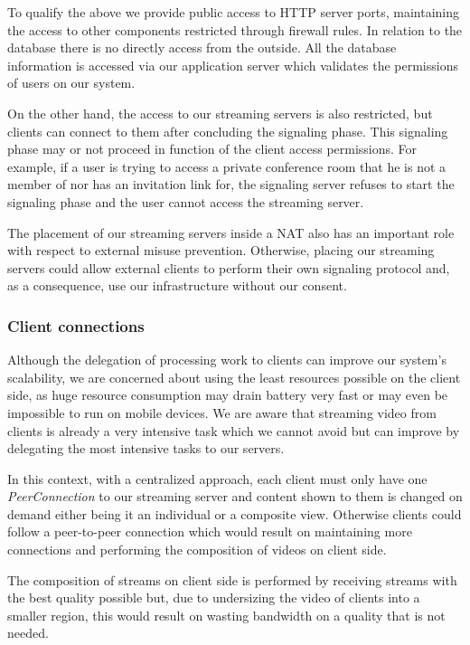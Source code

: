 \documentclass[conference,compsoc,a4paper]{IEEEtran}
\begin{document}
To qualify the above we provide public access to \gls{HTTP} server ports, maintaining the access to other components restricted through firewall rules.
In relation to the database there is no directly access from the outside. All the database information is accessed via our application server which validates the permissions of users on our system.

On the other hand, the access to our streaming servers is also restricted, but clients can connect to them after concluding the signaling phase. This signaling phase may or not proceed in function of the client access permissions. For example, if a user is trying to access a private conference room that he is not a member of nor has an invitation link for, the signaling server refuses to start the signaling phase and the user cannot access the streaming server.

The placement of our streaming servers inside a \gls{NAT} also has an important role with respect to external misuse prevention. Otherwise, placing our streaming servers could allow external clients to perform their own signaling protocol and, as a consequence, use our infrastructure without our consent.

\subsubsection{Client connections}
	Although the delegation of processing work to clients can improve our system's scalability, we are concerned about using the least resources possible on the client side, as huge resource consumption may drain battery very fast or may even be impossible to run on mobile devices. We are aware that streaming video from clients is already a very intensive task which we cannot avoid but can improve by delegating the most intensive tasks to our servers. 


	In this context, with a centralized approach, each client must only have one \emph{PeerConnection} to our streaming server and content shown to them is changed on demand either being it an individual or a composite view. Otherwise clients could follow a peer-to-peer connection which would result on maintaining more connections and performing the composition of videos on client side.

	The composition of streams on client side is performed by receiving streams with the best quality possible but, due to undersizing the video of clients into a smaller region, this would result on wasting bandwidth on a quality that is not needed.
\end{document}
